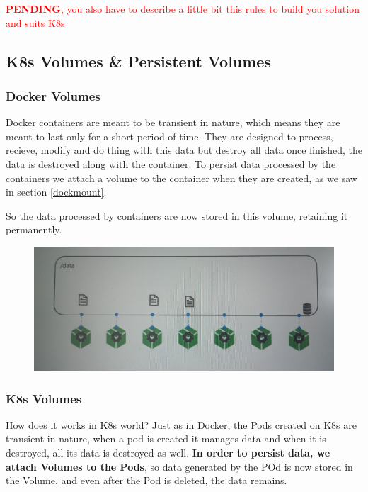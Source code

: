 \documentclass{article}
\begin{document}
\textcolor{red}{\textbf{PENDING}, you also have to describe a little bit this rules to build you solution and suits K8s}

\subsection{K8s Volumes \& Persistent Volumes}

\subsubsection{Docker Volumes}

Docker containers are meant to be transient in nature, which means they are meant to last only for a short period of time. They are designed to process, recieve, modify and do thing with this data but destroy all data once finished, the data is destroyed along with the container. To persist data processed by the containers we attach a volume to the container when they are created, as we saw in section \ref{dockmount}. 

So the data processed by containers are now stored in this volume, retaining it permanently.

\begin{figure}[H]
    \includegraphics[width=\textwidth]{pictures/st4.png}
\end{figure}

\subsubsection{K8s Volumes}

How does it works in K8s world? Just as in Docker, the Pods created on K8s are transient in nature, when a pod is created it manages data and when it is destroyed, all its data is destroyed as well. \textbf{In order to persist data, we attach Volumes to the Pods}, so data generated by the POd is now stored in the Volume, and even after the Pod is deleted, the data remains.
\end{document}
